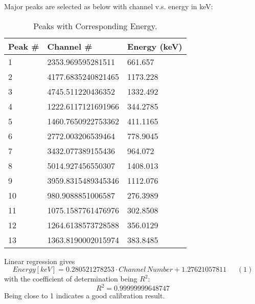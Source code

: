 Major peaks are selected as below with channel v.s. energy in keV:

\begin{table}[h!]
  \begin{center}
    \caption{Peaks with Corresponding Energy.}
    \label{tab:table1}
    \begin{tabular}{l|l|l}
      \textbf{Peak \#} & \textbf{Channel \#} & \textbf{Energy (keV)}\\
      \hline
      1 & 2353.969595281511 & 661.657\\
      2 & 4177.6835240821465 & 1173.228\\
      3 & 4745.511220436352  & 1332.492\\
      4 & 1222.6117121691966  & 344.2785\\
      5 & 1460.7650922753362  & 411.1165\\
      6 & 2772.003206539464  & 778.9045\\
      7 & 3432.077389155436 & 964.072\\
      8 & 5014.927456550307 & 1408.013\\
      9 & 3959.8315489345346 & 1112.076\\
      10 & 980.9088851006587  & 276.3989\\
      11 & 1075.1587761476976 & 302.8508\\
      12 & 1264.6138573728588 & 356.0129\\
      13 & 1363.8190002015974 & 383.8485\\
 
    \end{tabular}
  \end{center}
\end{table}
Linear regression gives
\[Energy[keV]=0.280521278253 \cdot Channel\,Number+1.27621057811\,\,\,\,\,\,\,\,\,(1)\]
with the coefficient of determination being ${R^2}$:
\[{R^2}=0.99999999648747\]
Being close to 1 indicates a good calibration result.


